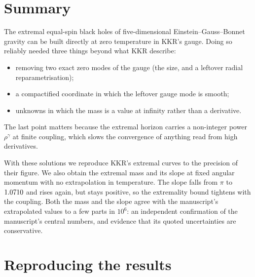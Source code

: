 \documentclass[11pt,a4paper]{article}
\begin{document}
\section{Summary}

The extremal equal-spin black holes of five-dimensional Einstein--Gauss--Bonnet
gravity can be built directly at zero temperature in KKR's gauge. Doing so
reliably needed three things beyond what KKR describe:
\begin{itemize}
\item removing two exact zero modes of the gauge (the size, and a leftover
radial reparametrisation);
\item a compactified coordinate in which the leftover gauge mode is smooth;
\item unknowns in which the mass is a value at infinity rather than a
derivative.
\end{itemize}
The last point matters because the extremal horizon carries a non-integer power
$\rho^\gamma$ at finite coupling, which slows the convergence of anything read
from high derivatives.

With these solutions we reproduce KKR's extremal curves to the precision of their
figure. We also obtain the extremal mass and its slope at fixed angular momentum
with no extrapolation in temperature. The slope falls from $\pi$ to $1.0710$
and rises again, but stays positive, so the extremality bound tightens with the
coupling. Both the mass and the slope agree with the manuscript's extrapolated
values to a few parts in $10^6$: an independent confirmation of the
manuscript's central numbers, and evidence that its quoted uncertainties are
conservative.

\appendix
\section{Reproducing the results}
\label{app:repro}
\end{document}
